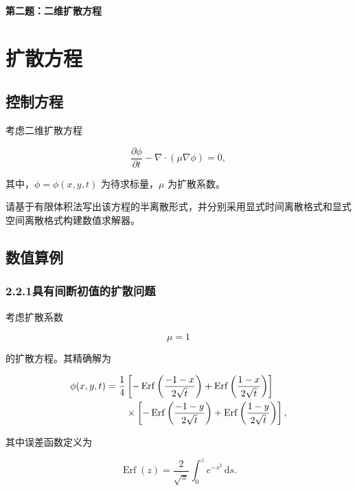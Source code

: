 \documentclass[UTF8,12pt,a4paper,fontset=fandol]{ctexart}
\begin{document}
\begin{center}
  {\LARGE\bfseries 第二题：二维扩散方程}
\end{center}
\vspace{0.8em}

\section{扩散方程}

\subsection{控制方程}

考虑二维扩散方程

\begin{equation}
\frac{\partial\phi}{\partial t}
-\nabla\cdot\left(\mu\nabla\phi\right)=0,
\end{equation}

其中，$\phi=\phi(x,y,t)$ 为待求标量，$\mu$ 为扩散系数。

请基于有限体积法写出该方程的半离散形式，并分别采用显式时间离散格式和显式空间离散格式构建数值求解器。

\subsection{数值算例}

\subsubsection{2.2.1\quad 具有间断初值的扩散问题}

考虑扩散系数

\begin{equation}
\mu=1
\end{equation}

的扩散方程。其精确解为

\begin{align}
\phi(x,y,t)
=\frac14
&\left[
-\operatorname{Erf}\left(\frac{-1-x}{2\sqrt{t}}\right)
+\operatorname{Erf}\left(\frac{1-x}{2\sqrt{t}}\right)
\right]
\notag\\
&\times
\left[
-\operatorname{Erf}\left(\frac{-1-y}{2\sqrt{t}}\right)
+\operatorname{Erf}\left(\frac{1-y}{2\sqrt{t}}\right)
\right],
\end{align}

其中误差函数定义为

\begin{equation}
\operatorname{Erf}(z)
=\frac{2}{\sqrt{\pi}}
\int_0^z e^{-s^2}\,\mathrm ds.
\end{equation}
\end{document}
